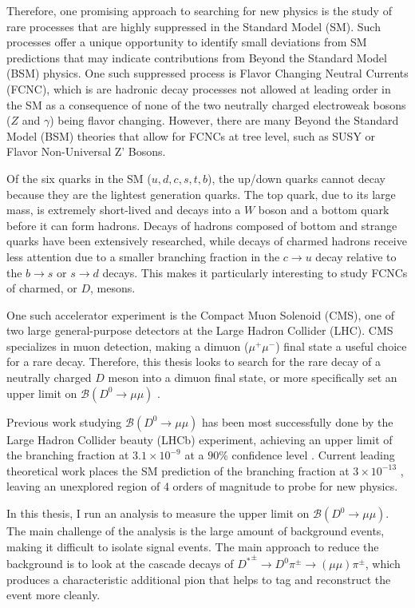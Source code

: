 Therefore, one promising approach to searching for new physics is the study of rare processes that are highly suppressed in the Standard Model (SM). Such processes offer a unique opportunity to identify small deviations from SM predictions that may indicate contributions from Beyond the Standard Model (BSM) physics. One such suppressed process is Flavor Changing Neutral Currents (FCNC), which is are hadronic decay processes not allowed at leading order in the SM as a consequence of none of the two neutrally charged electroweak bosons ($Z$ and $\gamma$) being flavor changing. However, there are many Beyond the Standard Model (BSM) theories that allow for FCNCs at tree level, such as SUSY or Flavor Non-Universal Z' Bosons.

Of the six quarks in the SM ($u,d,c,s,t,b$), the up/down quarks cannot decay because they are the lightest generation quarks. The top quark, due to its large mass, is extremely short-lived and decays into a $W$ boson and a bottom quark before it can form hadrons. Decays of hadrons composed of bottom and strange quarks have been extensively researched, while decays of charmed hadrons receive less attention due to a smaller branching fraction in the $c \to u$ decay relative to the $b\to s$ or $s \to d$ decays. This makes it particularly interesting to study FCNCs of charmed, or $D$, mesons.

One such accelerator experiment is the Compact Muon Solenoid (CMS), one of two large general-purpose detectors at the Large Hadron Collider (LHC). CMS specializes in muon detection, making a dimuon ($\mu^+\mu^-$) final state a useful choice for a rare decay. Therefore, this thesis looks to search for the rare decay of a neutrally charged $D$ meson into a dimuon final state, or more specifically set an upper limit on $\mathcal{B}(D^0 \to \mu \mu)$ \cite{chargeconj}.

Previous work studying $\mathcal{B}(D^0 \to \mu \mu)$ has been most successfully done by the Large Hadron Collider beauty (LHCb) experiment, achieving an upper limit of the branching fraction at $3.1\times 10^{-9}$ at a $90\%$ confidence level \cite{ref:lhcb_2023}. Current leading theoretical work places the SM prediction of the branching fraction at $3\times 10^{-13}$ \cite{ref:burdman_2002}, leaving an unexplored region of 4 orders of magnitude to probe for new physics.

In this thesis, I run an analysis to measure the upper limit on $\mathcal{B}(D^0 \to \mu\mu)$. The main challenge of the analysis is the large amount of background events, making it difficult to isolate signal events. The main approach to reduce the background is to look at the cascade decays of ${D^*}^\pm \to D^0 \pi^\pm \to (\mu\mu) \pi^\pm$, which produces a characteristic additional pion that helps to tag and reconstruct the event more cleanly. 

